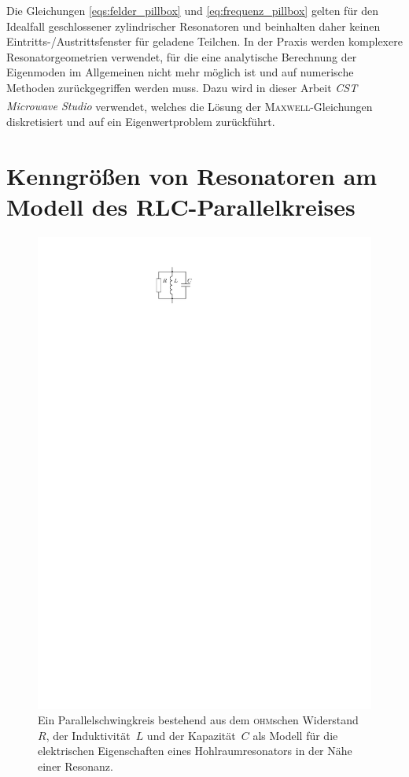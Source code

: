Die Gleichungen \eqref{eqs:felder_pillbox} und \eqref{eq:frequenz_pillbox} gelten für den Idealfall geschlossener zylindrischer Resonatoren und beinhalten daher keinen Eintritts-/Austrittsfenster für geladene Teilchen.
In der Praxis werden komplexere Resonatorgeometrien verwendet, für die eine analytische Berechnung der Eigenmoden im Allgemeinen nicht mehr möglich ist und auf numerische Methoden zurückgegriffen werden muss.
Dazu wird in dieser Arbeit \emph{CST Microwave Studio\textsuperscript{\textregistered}} verwendet, welches die Lösung der \textsc{Maxwell}-Gleichungen diskretisiert und auf ein Eigenwertproblem zurückführt.


\section{Kenngrößen von Resonatoren am Modell des RLC-Parallelkreises}
\begin{figure}[htb]
  \centering
  \includegraphics[scale=1.4]{./figs/RLC_circuit.pdf}
  \caption[Parallelschwingkreis als Modell für die elektrischen Eigenschaften eines Hohlraumresonators in der Nähe einer Resonanz]{Ein Parallelschwingkreis bestehend aus dem \textsc{ohm}schen Widerstand~$R$, der Induktivität~$L$ und der Kapazität~$C$ als Modell für die elektrischen Eigenschaften eines Hohlraumresonators in der Nähe einer Resonanz.}
  \label{fig:rlc_circuit}
\end{figure}
